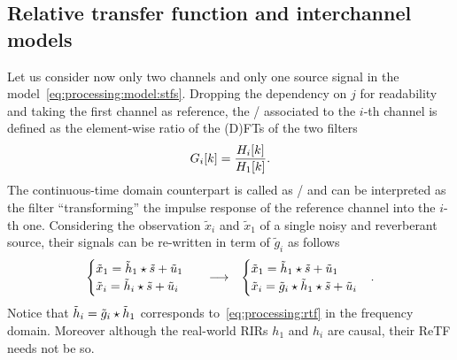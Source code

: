 \subsection{Relative transfer function and interchannel models}\label{subsec:processing:rtf}
Let us consider now only two channels and only one source signal in the model~\cref{eq:processing:model:stfs}.
Dropping the dependency on $j$ for readability and taking the first channel as reference, the \ReTFdef/ associated to the $i$-th channel is defined as
the element-wise ratio of the (D)FTs of the two filters~
\begin{equation}\label{eq:processing:rtf}
    {G}_i[k] = \frac{{H}_i[k]}{{H}_1[k]}
    .
\end{equation}
The continuous-time domain counterpart is called as \ReIRdef/ and can be interpreted as the filter ``transforming'' the impulse response of the reference channel into the $i$-th one.
Considering the observation $\tilde{x}_i$ and $\tilde{x}_1$ of a single noisy and reverberant source, their signals can be re-written in term of $\tilde{g}_i$ as follows
\begin{equation}
    \begin{matrix}
    \begin{cases}
        \tilde{x}_1 = \tilde{h}_1 \star \tilde{s} + \tilde{u}_1 \\
        \tilde{x}_i = \tilde{h}_i \star \tilde{s} + \tilde{u}_i
    \end{cases} & \longrightarrow  & \begin{cases}
        \tilde{x}_1 = \tilde{h}_1 \star \tilde{s} + \tilde{u}_1 \\
        \tilde{x}_i = \tilde{g}_i \star \tilde{h}_1 \star \tilde{s} + \tilde{u}_i
    \end{cases}
    \end{matrix}
    .
\end{equation}
Notice that $\tilde{h}_i = \tilde{g}_i \star \tilde{h}_1$ corresponds to~\cref{eq:processing:rtf} in the frequency domain.
Moreover although the real-world \acp{RIR} $h_1$ and $h_i$ are causal, their \ac{ReTF} needs not be so.

